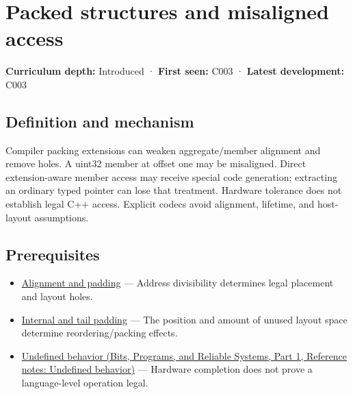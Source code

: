 \hypertarget{appendix-0682dbfc5f0e}{}\label{referencestart:appendix-0682dbfc5f0e}
\section{Packed structures and misaligned access}\label{appendix-0682dbfc5f0e-packed-structures-and-misaligned-access}

\hypertarget{appendix-0682dbfc5f0e-packed-structures-and-misaligned-access}{}

\textbf{Curriculum depth:} Introduced · \textbf{First seen:} C003 · \textbf{Latest development:} C003

\begin{allmightroledefinition}

\subsection{Definition and mechanism}\label{appendix-0682dbfc5f0e-definition-and-mechanism}

\hypertarget{appendix-0682dbfc5f0e-definition-and-mechanism}{}

Compiler packing extensions can weaken aggregate/member alignment and remove holes. A uint32 member at offset one may be misaligned. Direct extension-aware member access may receive special code generation; extracting an ordinary typed pointer can lose that treatment. Hardware tolerance does not establish legal C++ access. Explicit codecs avoid alignment, lifetime, and host-layout assumptions.

\end{allmightroledefinition}

\subsection{Prerequisites}\label{appendix-0682dbfc5f0e-prerequisites}

\hypertarget{appendix-0682dbfc5f0e-prerequisites}{}

\begin{itemize}
\tightlist
\item
  \hyperref[appendix-a1f7c53b4742]{Alignment and padding} --- Address divisibility determines legal placement and layout holes.
\item
  \hyperref[appendix-f52f8c5a3afd]{Internal and tail padding} --- The position and amount of unused layout space determine reordering/packing effects.
\item
  \href{../01-Bits-Programs-and-Reliable-Systems-P01/main.pdf\#nameddest=appendix-f558f5b4d8f2}{Undefined behavior (Bits, Programs, and Reliable Systems, Part 1, Reference notes: Undefined behavior)} --- Hardware completion does not prove a language-level operation legal.
\end{itemize}

